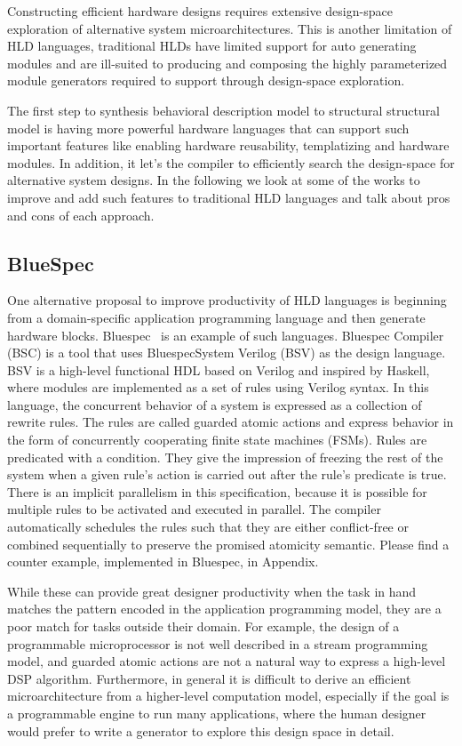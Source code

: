 Constructing efficient hardware designs requires extensive design-space exploration of alternative system microarchitectures. 
This is another limitation of HLD languages, traditional HLDs have limited support for auto generating modules and are ill-suited to producing and composing the highly parameterized module generators required to support through design-space exploration.

The first step to synthesis behavioral description model to structural structural model is having more powerful hardware languages that can support such important features like enabling hardware reusability, templatizing and hardware modules. In addition, it let's the compiler to efficiently search the design-space for alternative system designs. In the following we look at some of the works to improve and add such features to traditional HLD languages and talk about pros and cons of each approach.

\subsection{BlueSpec}

One alternative proposal to improve productivity of HLD languages is beginning from a domain-specific application programming language and then generate hardware blocks. 
Bluespec~\cite{bluespec} is an example of such languages.
Bluespec Compiler (BSC) is a tool that uses BluespecSystem  Verilog  (BSV)  as  the  design  language.
BSV is a high-level functional HDL based on Verilog and inspired by Haskell, where  modules are implemented as a set of rules using  Verilog  syntax.
In this language, the concurrent behavior of a system is expressed as a collection of rewrite rules.
The rules are called guarded atomic actions and express behavior in the form of concurrently cooperating finite state machines (FSMs).
Rules are predicated with a condition. They give the impression of freezing the rest of the system when a given rule's action is carried out after the rule's predicate is true.
There is an implicit parallelism in this specification, because it is possible for multiple rules to be activated and executed in parallel.
The compiler automatically schedules the rules such that they are either conflict-free or combined sequentially to preserve the promised atomicity semantic.
Please find a counter example, implemented in Bluespec, in  Appendix.

While these can provide great designer productivity when the task in hand matches the pattern encoded in the application programming model, they are a poor match for tasks outside their domain.
For example, the design of a programmable microprocessor is not well described in a stream
programming model, and guarded atomic actions are not a natural way to express a high-level DSP algorithm.
Furthermore, in general it is difficult to derive an efficient microarchitecture from a higher-level computation model, especially if the goal is a programmable engine to run many applications, where the human designer would prefer to write a generator to explore this design space in detail.


